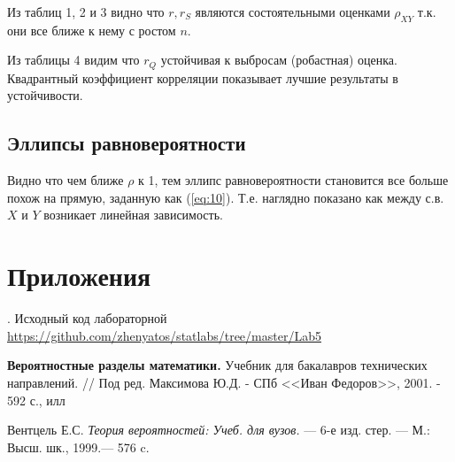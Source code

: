 \documentclass[12pt,a4paper]{article}
\begin{document}
Из таблиц 1, 2 и 3 видно что $r, r_S$ являются состоятельными оценками $\rho_{XY}$ т.к. они все ближе к нему с ростом $n$.

Из таблицы 4 видим что $r_Q$ устойчивая к выбросам (робастная) оценка. Квадрантный коэффициент корреляции показывает лучшие результаты в устойчивости.

\subsection{Эллипсы равновероятности}
Видно что чем ближе $\rho$ к 1, тем эллипс равновероятности становится все больше похож на прямую, заданную как (\ref{eq:10}). Т.е. наглядно показано как между с.в. $X$ и $Y$ возникает линейная зависимость.
\pagebreak

\section{Приложения}
. Исходный код лабораторной {\url{https://github.com/zhenyatos/statlabs/tree/master/Lab5}}

\begin{thebibliography}{9} 
	 \textbf{Вероятностные разделы математики.} Учебник для бакалавров технических направлений. // Под ред. Максимова Ю.Д. - СПб <<Иван Федоров>>, 2001. - 592 с., илл
	
	 Вентцель Е.С. \textit{Теория вероятностей: Учеб. для вузов.} — 6-е изд. стер. — М.: Высш. шк., 1999.— 576 c.
\end{thebibliography}
\end{document}
